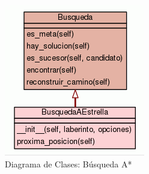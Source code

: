 \documentclass[letter, titlepage, 10pt]{article}
\begin{document}
\begin{figure}[H]
    \begin{center}
        \includegraphics[scale = 0.5]{images/diagram_bae}
        \caption{Diagrama de Clases: Búsqueda A*}
    \end{center}
\end{figure}
\end{document}
